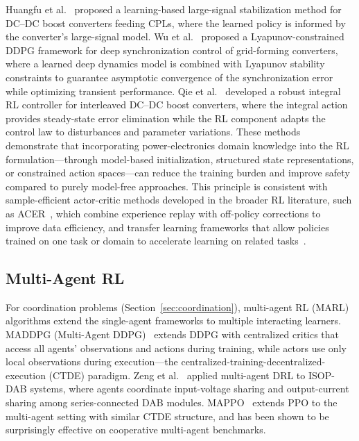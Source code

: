 \documentclass[manuscript,screen,review]{acmart}
\begin{document}
Huangfu et al.~\cite{huangfu2022learning} proposed a learning-based large-signal stabilization method for DC--DC boost converters feeding CPLs, where the learned policy is informed by the converter's large-signal model.
Wu et al.~\cite{wu2025deep} proposed a Lyapunov-constrained DDPG framework for deep synchronization control of grid-forming converters, where a learned deep dynamics model is combined with Lyapunov stability constraints to guarantee asymptotic convergence of the synchronization error while optimizing transient performance.
Qie et al.~\cite{qie2022new} developed a robust integral RL controller for interleaved DC--DC boost converters, where the integral action provides steady-state error elimination while the RL component adapts the control law to disturbances and parameter variations.
These methods demonstrate that incorporating power-electronics domain knowledge into the RL formulation---through model-based initialization, structured state representations, or constrained action spaces---can reduce the training burden and improve safety compared to purely model-free approaches.
This principle is consistent with sample-efficient actor-critic methods developed in the broader RL literature, such as ACER~\cite{wang2016sample}, which combine experience replay with off-policy corrections to improve data efficiency, and transfer learning frameworks that allow policies trained on one task or domain to accelerate learning on related tasks~\cite{lazaric2012transfer,parisotto2016actor}.

\subsection{Multi-Agent RL}

For coordination problems (Section~\ref{sec:coordination}), multi-agent RL (MARL) algorithms extend the single-agent frameworks to multiple interacting learners.
MADDPG (Multi-Agent DDPG)~\cite{lowe2017multi} extends DDPG with centralized critics that access all agents' observations and actions during training, while actors use only local observations during execution---the centralized-training-decentralized-execution (CTDE) paradigm.
Zeng et al.~\cite{zeng2022autonomous,zeng2022multiagent} applied multi-agent DRL to ISOP-DAB systems, where agents coordinate input-voltage sharing and output-current sharing among series-connected DAB modules.
MAPPO~\cite{yu2022surprising} extends PPO to the multi-agent setting with similar CTDE structure, and has been shown to be surprisingly effective on cooperative multi-agent benchmarks.
\end{document}
